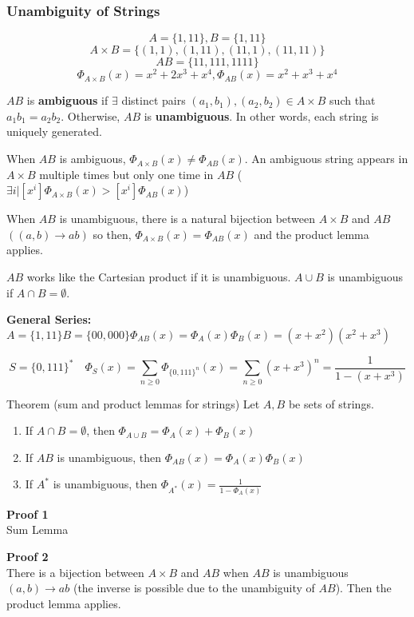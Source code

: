 \documentclass{article}
\begin{document}
\subsubsection{Unambiguity of Strings}
\example

$$A = \{1,11\}, B = \{1,11\}$$
$$A \times B = \{(1,1), (1,11), (11,1), (11,11) \}$$
$$AB = \{11,111,1111\}$$
$$\Phi_{A \times B}(x) = x^2 + 2x^3 + x^4, \Phi_{AB}(x) = x^2 + x^3 + x^4$$

\begin{defn}
	$AB$ is \textbf{ambiguous} if $\exists$ distinct pairs $(a_1,b_1),(a_2,b_2) \in A \times B$ such that $a_1b_1 = a_2b_2$. Otherwise, $AB$ is \textbf{unambiguous}. In other words, each string is uniquely generated.
\end{defn}

When $AB$ is ambiguous, $\Phi_{A \times B}(x) \ne \Phi_{AB}(x)$. An ambiguous string appears in $A \times B$ multiple times but only one time in $AB$ ($\exists i | [x^i]\Phi_{A \times B}(x) > [x^i]\Phi_{AB}(x)$)

When $AB$ is unambiguous, there is a natural bijection between $A \times B$ and $AB$ $( (a,b) \rightarrow ab )$ so then, $\Phi_{A \times B}(x) = \Phi_{AB}(x)$ and the product lemma applies.

$AB$ works like the Cartesian product if it is unambiguous. $A \cup B$ is unambiguous if $A \cap B = \emptyset$.

\textbf{General Series: } $A = \{ 1,11 \} B = \{ 00, 000 \} \Phi_{AB}(x) = \Phi_A(x) \Phi_B(x) = (x+x^2)(x^2+x^3)$

$$S = \{ 0, 111 \}^* \quad \Phi_S(x) = \sum_{n \ge 0}\Phi_{\{0,111 \}^n}(x) = \sum_{n \ge 0}(x+x^3)^n = \frac{1}{1 - (x+x^3)}$$

Theorem (sum and product lemmas for strings)
Let $A,B$ be sets of strings.
\begin{enumerate}
	\item If $A \cap B = \emptyset$, then $\Phi_{A \cup B} = \Phi_A(x) + \Phi_B(x)$
	\item If $AB$ is unambiguous, then $\Phi_{AB}(x) = \Phi_A(x) \Phi_B(x)$
	\item If $A^*$ is unambiguous, then $\Phi_{A^*}(x) = \frac{1}{1 - \Phi_A(x)}$
\end{enumerate}
\textbf{Proof 1\\}
Sum Lemma

\textbf{Proof 2\\}
There is a bijection between $A \times B$ and $AB$ when $AB$ is unambiguous $(a,b) \rightarrow ab$  (the inverse is possible due to the unambiguity of $AB$). Then the product lemma applies.
\end{document}
